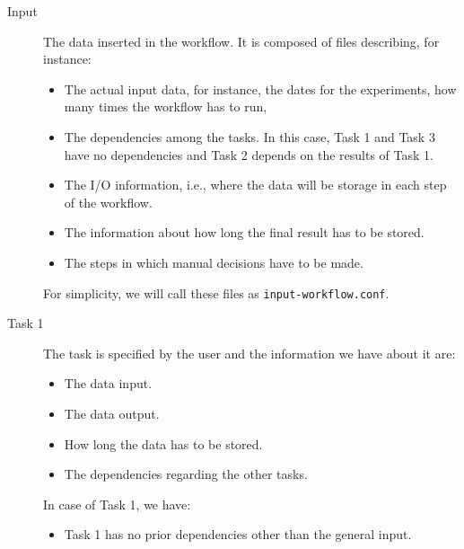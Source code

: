 \documentclass[a4paper]{article}
\begin{document}
\begin{description}

\item[Input] The data inserted in the workflow. It is composed of files describing, for instance:

\begin{itemize}

\item The actual input data, for instance, the dates for the experiments, how many times the workflow has to run,

\item The dependencies among the tasks. In this case, Task 1 and Task 3 have no dependencies and Task 2 depends on the results of Task 1.

\item The I/O information, i.e., where the data will be storage in each step of the workflow.

\item The information about how long the final result has to be stored.

\item The steps in which manual decisions have to be made.

\end{itemize}

For simplicity, we will call these files as \texttt{input-workflow.conf}.

\item[Task 1] The task is specified by the user and the information we have about it are:

\begin{itemize}

\item The data input.

\item The data output.

\item How long the data has to be stored.

\item The dependencies regarding the other tasks.

\end{itemize}

In case of Task 1, we have:

\begin{itemize}

\item Task 1 has no prior dependencies other than the general input.


\end{itemize}
\end{description}
\end{document}
